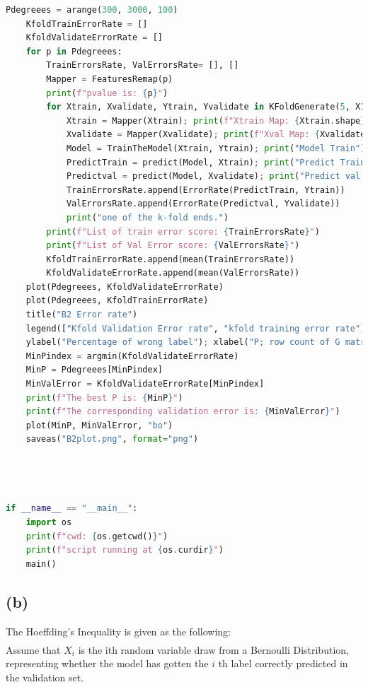 \documentclass[]{article}
\begin{document}
\begin{lstlisting}[language=python]
	Pdegreees = arange(300, 3000, 100)
	KfoldTrainErrorRate = []
	KfoldValidateErrorRate = []
	for p in Pdegreees:
		TrainErrorsRate, ValErrorsRate= [], []
		Mapper = FeaturesRemap(p)
		print(f"pvalue is: {p}")
		for Xtrain, Xvalidate, Ytrain, Yvalidate in KFoldGenerate(5, X1, Y1):
			Xtrain = Mapper(Xtrain); print(f"Xtrain Map: {Xtrain.shape}")
			Xvalidate = Mapper(Xvalidate); print(f"Xval Map: {Xvalidate.shape}")
			Model = TrainTheModel(Xtrain, Ytrain); print("Model Train")
			PredictTrain = predict(Model, Xtrain); print("Predict Train Labels")
			Predictval = predict(Model, Xvalidate); print("Predict val labels")
			TrainErrorsRate.append(ErrorRate(PredictTrain, Ytrain))
			ValErrorsRate.append(ErrorRate(Predictval, Yvalidate))
			print("one of the k-fold ends.")
		print(f"List of train error score: {TrainErrorsRate}")
		print(f"List of Val Error score: {ValErrorsRate}")
		KfoldTrainErrorRate.append(mean(TrainErrorsRate))
		KfoldValidateErrorRate.append(mean(ValErrorsRate))
	plot(Pdegreees, KfoldValidateErrorRate)
	plot(Pdegreees, KfoldTrainErrorRate)
	title("B2 Error rate")
	legend(["Kfold Validation Error rate", "kfold training error rate"])
	ylabel("Percentage of wrong label"); xlabel("P; row count of G matrix")
	MinPindex = argmin(KfoldValidateErrorRate)
	MinP = Pdegreees[MinPindex]
	MinValError = KfoldValidateErrorRate[MinPindex]
	print(f"The best P is: {MinP}")
	print(f"The corresponding validation error is: {MinValError}")
	plot(MinP, MinValError, "bo")
	saveas("B2plot.png", format="png")




if __name__ == "__main__":
	import os
	print(f"cwd: {os.getcwd()}")
	print(f"script running at {os.curdir}")
	main()

			\end{lstlisting}
		\subsection*{(b)}
			The Hoeffding's Inequality is given as the following: 
			\begin{align*}\tag{B.2.1}\label{eqn:B.2.1}
			\end{align*}
			Assume that $X_i$ is the ith random variable draw from a Bernoulli Distribution, representing whether the model has gotten the $i$ th label correctly predicted in the validation set.  

		 
\end{document}
